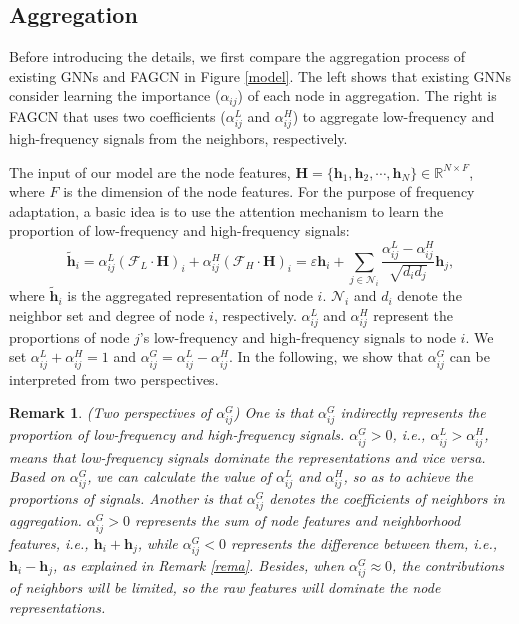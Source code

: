 \documentclass[letterpaper]{article} %
\newtheorem{remark}{Remark}
\begin{document}
\subsection{Aggregation}
Before introducing the details, we first compare the aggregation process of existing GNNs and FAGCN in Figure \ref{model}. The left shows that existing GNNs consider learning the importance ($\alpha_{ij}$) of each node in aggregation. The right is FAGCN that uses two coefficients ($\alpha^{L}_{ij}$ and $\alpha^{H}_{ij}$) to aggregate low-frequency and high-frequency signals from the neighbors, respectively.

The input of our model are the node features, $\mathbf{H}=\{ \mathbf{h}_{1},\mathbf{h}_{2},\cdots,\mathbf{h}_{N} \} \in \mathbb{R}^{N \times F}$, where $F$ is the dimension of the node features.
For the purpose of frequency adaptation, a basic idea is to use the attention mechanism to learn the proportion of low-frequency and high-frequency signals:
\begin{equation}
	\tilde{\mathbf{h}}_{i} = \alpha_{ij}^{L} (\mathcal{F}_{L} \cdot \mathbf{H})_{i} + \alpha_{ij}^{H} (\mathcal{F}_{H} \cdot \mathbf{H})_{i} = \varepsilon \mathbf{h}_{i} + \sum_{j \in \mathcal{N}_{i}} \frac{\alpha_{ij}^{L} - \alpha_{ij}^{H}}{\sqrt{d_{i}d_{j}}} \mathbf{h}_{j},
\end{equation}
where $\tilde{\mathbf{h}}_{i}$ is the aggregated representation of node $i$. $\mathcal{N}_{i}$ and $d_{i}$ denote the neighbor set and degree of node $i$, respectively. $\alpha_{ij}^{L}$ and $\alpha_{ij}^{H}$ represent the proportions of node $j$'s low-frequency and high-frequency signals to node $i$.
We set $\alpha_{ij}^{L} + \alpha_{ij}^{H}=1$ and $\alpha_{ij}^{G} = \alpha_{ij}^{L} - \alpha_{ij}^{H}$.
In the following, we show that $\alpha_{ij}^{G}$ can be interpreted from two perspectives.

\begin{remark}
	(Two perspectives of $\alpha_{ij}^{G}$) One is that $\alpha_{ij}^{G}$ indirectly represents the proportion of low-frequency and high-frequency signals.  $\alpha_{ij}^{G} > 0$, i.e., $\alpha_{ij}^{L} > \alpha_{ij}^{H}$, means that low-frequency signals dominate the representations and vice versa.
	Based on $\alpha_{ij}^{G}$, we can calculate the value of $\alpha_{ij}^{L}$ and $\alpha_{ij}^{H}$, so as to achieve the proportions of signals.
	Another is that $\alpha_{ij}^{G}$ denotes the coefficients of neighbors in aggregation. $\alpha_{ij}^{G} > 0$ represents the sum of node features and neighborhood features, i.e., $\mathbf{h}_{i} + \mathbf{h}_{j}$, while $\alpha_{ij}^{G} < 0$ represents the difference between them, i.e., $\mathbf{h}_{i} - \mathbf{h}_{j}$, as explained in Remark \ref{rema}. Besides, when $\alpha_{ij}^{G} \approx 0$, the contributions of neighbors will be limited, so the raw features will dominate the node representations.
\end{remark}
\end{document}
